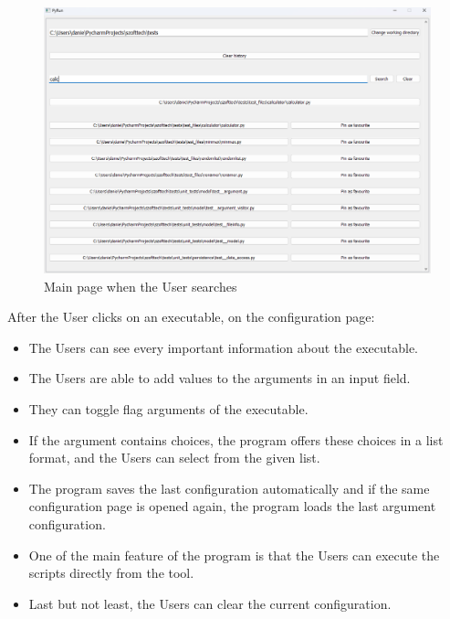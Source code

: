 \documentclass{article}
\begin{document}
\begin{figure}[h]
    \centering
    \includegraphics[width=1\linewidth]{img/search.png}
    \caption{Main page when the User searches}
    \label{fig:enter-label}
\end{figure}

\clearpage

After the User clicks on an executable, on the configuration page:
\begin{itemize}
    \item The Users can see every important information about the executable.
    \item The Users are able to add values to the arguments in an input field. 
    \item They can toggle flag arguments of the executable.
    \item If the argument contains choices, the program offers these choices in a list format, and the Users can select from the given list.
    \item The program saves the last configuration automatically and if the same configuration page is opened again, the program loads the last argument configuration.
    \item One of the main feature of the program is that the Users can execute the scripts directly from the tool.
    \item Last but not least, the Users can clear the current configuration.
\end{itemize}
\end{document}
